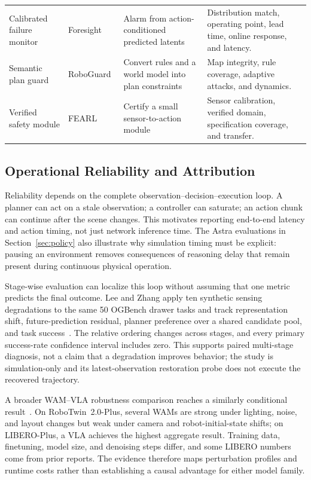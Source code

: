 \begin{table}[t]
\begin{tabularx}{\linewidth}{@{}>{\raggedright\arraybackslash}p{.18\linewidth}YYY@{}}
\addlinespace
Calibrated failure monitor & Foresight~\cite{zhang2026foresight} & Alarm from action-conditioned predicted latents & Distribution match, operating point, lead time, online response, and latency. \\
\addlinespace
Semantic plan guard & RoboGuard~\cite{ravichandran2026roboguard} & Convert rules and a world model into plan constraints & Map integrity, rule coverage, adaptive attacks, and dynamics. \\
\addlinespace
Verified safety module & FEARL~\cite{corsi2026fearl} & Certify a small sensor-to-action module & Sensor calibration, verified domain, specification coverage, and transfer. \\
\bottomrule
\end{tabularx}
\end{table}

\subsection{Operational Reliability and Attribution}
Reliability depends on the complete observation--decision--execution loop. A planner can act on a stale observation; a controller can saturate; an action chunk can continue after the scene changes. This motivates reporting end-to-end latency and action timing, not just network inference time. The Astra evaluations in Section~\ref{sec:policy} also illustrate why simulation timing must be explicit: pausing an environment removes consequences of reasoning delay that remain present during continuous physical operation.

Stage-wise evaluation can localize this loop without assuming that one metric predicts the final outcome. Lee and Zhang apply ten synthetic sensing degradations to the same 50 OGBench drawer tasks and track representation shift, future-prediction residual, planner preference over a shared candidate pool, and task success~\cite{lee2026stagewise}. The relative ordering changes across stages, and every primary success-rate confidence interval includes zero. This supports paired multi-stage diagnosis, not a claim that a degradation improves behavior; the study is simulation-only and its latest-observation restoration probe does not execute the recovered trajectory.

A broader WAM--VLA robustness comparison reaches a similarly conditional result~\cite{zhang2026wamrobustness}. On RoboTwin~2.0-Plus, several WAMs are strong under lighting, noise, and layout changes but weak under camera and robot-initial-state shifts; on LIBERO-Plus, a VLA achieves the highest aggregate result. Training data, finetuning, model size, and denoising steps differ, and some LIBERO numbers come from prior reports. The evidence therefore maps perturbation profiles and runtime costs rather than establishing a causal advantage for either model family.

